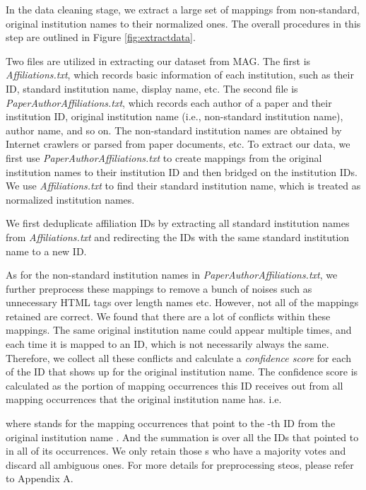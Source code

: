 \documentclass{article}
\begin{document}
In the data cleaning stage, we extract a large set of mappings from non-standard, original institution names to their normalized ones. The overall procedures in this step are outlined in Figure \ref{fig:extractdata}. 

Two files are utilized in extracting our dataset from MAG. The first is \textit{Affiliations.txt}, which records basic information of each institution, such as their ID, standard institution name, display name, etc. The second file is \textit{PaperAuthorAffiliations.txt}, which records each author of a paper and their institution ID, original institution name (i.e., non-standard institution name), author name, and so on. The non-standard institution names are obtained by Internet crawlers or parsed from paper documents, etc. To extract our data, we first use \textit{PaperAuthorAffiliations.txt} to create mappings from the original institution names to their institution ID and then bridged on the institution IDs. We use \textit{Affiliations.txt} to find their standard institution name, which is treated as normalized institution names. 

We first deduplicate affiliation IDs by extracting all standard institution names from \textit{Affiliations.txt} and redirecting the IDs with the same standard institution name to a new ID.

As for the non-standard institution names in \textit{PaperAuthorAﬀiliations.txt}, we further preprocess these mappings to remove a bunch of noises such as unnecessary HTML tags over length names etc. However, not all of the mappings retained are correct. We found that there are a lot of conflicts within these mappings. The same original institution name could appear multiple times, and each time it is mapped to an ID, which is not necessarily always the same. Therefore, we collect all these conflicts and calculate a \textit{confidence score} for each of the ID that shows up for the original institution name. The confidence score is calculated as the portion of mapping occurrences this ID receives out from all mapping occurrences that the original institution name has. i.e. 



where  stands for the mapping occurrences that point to the -th ID from the original institution name . And the summation is over all the  IDs that  pointed to in all of its occurrences. We only retain those s who have a majority votes and discard all ambiguous ones. For more details for preprocessing steos, please refer to Appendix A.
\end{document}
